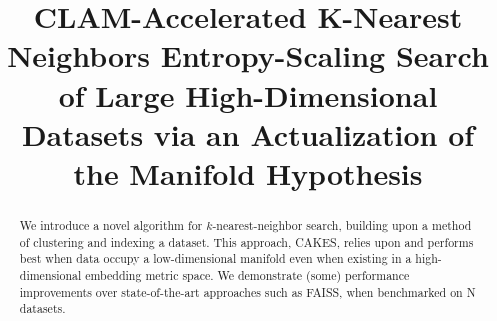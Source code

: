 \documentclass[conference,compsoc]{IEEEtran}
\begin{document}
\title{CLAM-Accelerated K-Nearest Neighbors Entropy-Scaling Search of Large High-Dimensional Datasets via an Actualization of the Manifold Hypothesis}
\author{
\and
{}
\and
{}
\and
{}
\and
{}
}

\IEEEoverridecommandlockouts
{}
\maketitle
\IEEEpubidadjcol

\begin{abstract}
   We introduce a novel algorithm for $k$-nearest-neighbor search, building upon a method of clustering and indexing a dataset. This approach, CAKES, relies upon and performs best when data occupy a low-dimensional manifold even when existing in a high-dimensional embedding metric space. We demonstrate (some) performance improvements over state-of-the-art approaches such as FAISS, when benchmarked on N datasets.
  \end{abstract}
\end{document}

